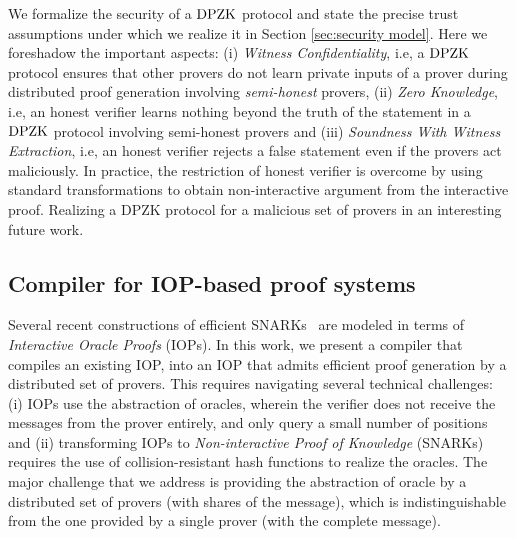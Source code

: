 We formalize the security of a $\text{DPZK}$ protocol and state the precise trust assumptions under which we realize it in Section \ref{sec:security model}.
Here we foreshadow the important aspects: (i) {\em Witness Confidentiality}, i.e, a $\text{DPZK}$ protocol ensures that other provers do not learn private inputs of a prover during 
distributed proof generation involving {\em semi-honest} provers, 
(ii) {\em Zero Knowledge}, i.e, an honest verifier learns nothing beyond the truth of the statement 
in a $\text{DPZK}$ protocol involving semi-honest provers and (iii) {\em Soundness With Witness Extraction}, i.e, an honest verifier rejects a false statement even if the provers act maliciously.
In practice, the restriction of honest verifier is overcome by using standard transformations to obtain non-interactive 
argument from the interactive proof. Realizing a DPZK protocol for a malicious set of provers in an interesting future work.


\subsection{Compiler for IOP-based proof systems}
Several recent constructions of efficient SNARKs~\cite{aurora, BCS16} are modeled in terms of {\em Interactive Oracle Proofs} (IOPs). In this work, we present a compiler that compiles an existing IOP, into an IOP
that admits efficient proof generation by a distributed set of provers. This requires navigating several technical challenges: (i) IOPs use the abstraction of oracles, wherein the verifier does not receive the messages from the prover entirely, and only query a small number of positions and
(ii) transforming IOPs to {\em Non-interactive Proof of Knowledge} (SNARKs) requires the use of
collision-resistant hash functions to realize the oracles. The major challenge that we address is providing the abstraction of oracle by a distributed set of provers (with shares of the message), which is indistinguishable from the one provided by a single prover (with the complete message).

